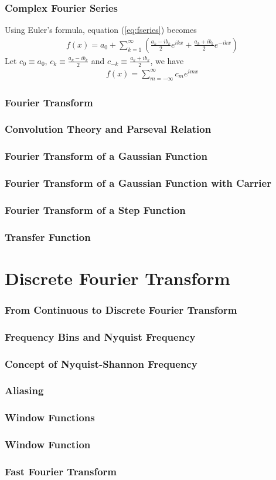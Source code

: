 \documentclass{beamer}
\begin{document}
\begin{frame}
\frametitle{Complex Fourier Series}
Using Euler's formula, equation (\ref{eq:fseries}) becomes 
\begin{eqnarray}
f(x)=a_0 + \sum_{k=1}^{\infty} \left(\frac{a_k - ib_k}{2} e^{ikx} + \frac{a_k + ib_k}{2}e^{-ikx}\right) \nonumber
\end{eqnarray}
Let $c_0 \equiv a_0$, $c_k \equiv \frac{a_k - ib_k}{2}$ and $c_{-k} \equiv \frac{a_k + ib_k}{2}$, we have
\begin{eqnarray}
f(x)=\sum_{m=-\infty}^{\infty} c_m e^{imx}
\label{eq:cfseries}
\end{eqnarray}
\end{frame}
\begin{frame}
\frametitle{Fourier Transform}
\end{frame}
\begin{frame}
\frametitle{Convolution Theory and Parseval Relation}
\end{frame}
\begin{frame}
\frametitle{Fourier Transform of a Gaussian Function}
\end{frame}
\begin{frame}
\frametitle{Fourier Transform of a Gaussian Function with Carrier}
\end{frame}
\begin{frame}
\frametitle{Fourier Transform of a Step Function}
\end{frame}
\begin{frame}
\frametitle{Transfer Function}
\end{frame}
\section{Discrete Fourier Transform}
\begin{frame}
\frametitle{From Continuous to Discrete Fourier Transform}
\end{frame}
\begin{frame}
\frametitle{Frequency Bins and Nyquist Frequency}
\end{frame}
\begin{frame}
\frametitle{Concept of Nyquist-Shannon Frequency}
\end{frame}
\begin{frame}
\frametitle{Aliasing}
\end{frame}
\begin{frame}
\frametitle{Window Functions}
\end{frame}
\begin{frame}
\frametitle{Window Function}
\end{frame}
\begin{frame}
\frametitle{Fast Fourier Transform}
\end{frame}
\end{document}
